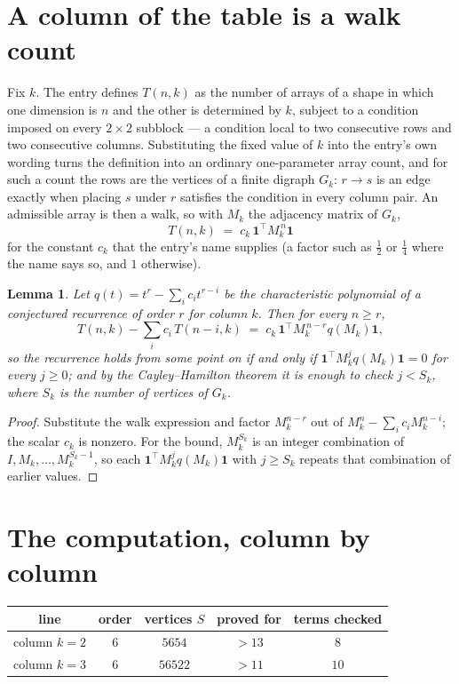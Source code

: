 \documentclass[11pt,a4paper]{article}
\theoremstyle{plain}
\newtheorem{lemma}[theorem]{Lemma}
\theoremstyle{definition}
\begin{document}
\section{A column of the table is a walk count}

Fix $k$. The entry defines $T(n,k)$ as the number of arrays of a shape in which one dimension
is $n$ and the other is determined by $k$, subject to a condition imposed on every
$2\times2$ subblock --- a condition local to two consecutive rows and two consecutive columns.
Substituting the fixed value of $k$ into the entry's own wording turns the definition into an
ordinary one-parameter array count, and for such a count the rows are the vertices of a finite
digraph $G_k$: $r\to s$ is an edge exactly when placing $s$ under $r$ satisfies the condition
in every column pair. An admissible array is then a walk, so with $M_k$ the adjacency matrix
of $G_k$,
\[
T(n,k)\;=\;c_k\,\mathbf{1}^{\!\top}M_k^{\,n}\mathbf{1}
\]
for the constant $c_k$ that the entry's name supplies (a factor such as $\tfrac12$ or
$\tfrac14$ where the name says so, and $1$ otherwise).

\begin{lemma}\label{lem:crit}
Let $q(t)=t^{r}-\sum_i c_it^{r-i}$ be the characteristic polynomial of a conjectured
recurrence of order $r$ for column $k$. Then for every $n\ge r$,
\[
T(n,k)-\sum_i c_i\,T(n-i,k)\;=\;c_k\,\mathbf{1}^{\!\top}M_k^{\,n-r}q(M_k)\mathbf{1},
\]
so the recurrence holds from some point on if and only if
$\mathbf{1}^{\!\top}M_k^{j}q(M_k)\mathbf{1}=0$ for every $j\ge0$; and by the
Cayley--Hamilton theorem it is enough to check $j<S_k$, where $S_k$ is the number of vertices
of $G_k$.
\end{lemma}

\begin{proof}
Substitute the walk expression and factor $M_k^{n-r}$ out of $M_k^{n}-\sum_ic_iM_k^{n-i}$;
the scalar $c_k$ is nonzero. For the bound, $M_k^{S_k}$ is an integer combination of
$I,M_k,\dots,M_k^{S_k-1}$, so each $\mathbf{1}^{\!\top}M_k^{j}q(M_k)\mathbf{1}$ with
$j\ge S_k$ repeats that combination of earlier values.
\end{proof}

\section{The computation, column by column}

\begin{center}
\begin{tabular}{ccccc}
line & order & vertices $S$ & proved for & terms checked \\ \hline
column $k$$=2$ & $6$ & $5654$ & $>13$ & $8$ \\
column $k$$=3$ & $6$ & $56522$ & $>11$ & $10$ \\
\end{tabular}
\end{center}
\end{document}
